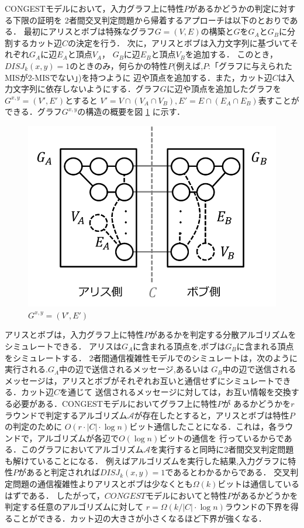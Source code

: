 \documentclass[12pt]{thesis}
\newcommand{\CONGEST}{\textsf{CONGEST}}
\theoremstyle{definition}
\begin{document}
{\CONGEST}モデルにおいて，入力グラフ上に特性$P$があるかどうかの判定に対する下限の証明を
2者間交叉判定問題から帰着するアプローチは以下のとおりである．
最初にアリスとボブは特殊なグラフ$G = (V, E)$の構築と$G$を$G_{A}$と$G_{B}$に分割するカット辺$C$の決定を行う．
次に，アリスとボブは入力文字列に基づいてそれぞれ$G_{A}$に辺$E_{A}$と頂点$V_{A}$，
$G_{B}$に辺$E_{B}$と頂点$V_{B}$を追加する．
このとき，$DISJ_{k} (x, y)=1$のときのみ，何らかの特性$P$(例えば,$P$:「グラフに与えられたMISが2-MISでない」)を持つように
辺や頂点を追加する．また，カット辺$C$は入力文字列に依存しないようにする．グラフ$G$に辺や頂点を追加したグラフを
$G^{x, y} = (V', E')$とすると
$V' = V \cap (V_{A} \cap V_{B}), E' = E \cap (E_{A} \cap E_{B})$表すことができる．グラフ$G^{x, y}$の構造の概要を図 \ref{Gxy} に示す．

\begin{figure}[ht]
\begin{center}
\includegraphics[width=120mm]{Gxy.png}
\end{center}
\caption{$G^{x, y} = (V', E')$}
\label{Gxy}
\end{figure}

アリスとボブは，入力グラフ上に特性$P$があるかを判定する分散アルゴリズムをシミュレートできる．
アリスは$G_{A}$に含まれる頂点を,ボブは$G_{B}$に含まれる頂点をシミュレートする．
2者間通信複雑性モデルでのシミュレートは，次のように実行される.$G_{A}$中の辺で送信されるメッセージ,あるいは
$G_{B}$中の辺で送信されるメッセージは，アリスとボブがそれぞれお互いと通信せずにシミュレートできる．カット辺$C$を通じて
送信されるメッセージに対しては，お互い情報を交換する必要がある．{\CONGEST}モデルにおいてグラフ上に特性$P$が
あるかどうかを$r$ラウンドで判定するアルゴリズム$\mathcal{A}$が存在したとすると，アリスとボブは特性$P$の判定のために
$O(r \cdot |C| \cdot \log n)$ビット通信したことになる．これは，各ラウンドで，アルゴリズムが各辺で$O(\log n)$ビットの通信を
行っているからである．このグラフにおいてアルゴリズム$\mathcal{A}$を実行すると同時に2者間交叉判定問題も解けていることになる．
例えばアルゴリズムを実行した結果,入力グラフに特性$P$があると判定されれば$DISJ_{k} (x, y)=1$であるとわかるからである．
交叉判定問題の通信複雑性よりアリスとボブは少なくとも$\Omega (k)$ビットは通信しているはずである．
したがって，$CONGEST$モデルにおいてと特性$P$があるかどうかを判定する任意のアルゴリズムに対して
$r = \Omega (k / |C| \cdot \log n)$ラウンドの下界を得ることができる．カット辺の大きさが小さくなるほど下界が強くなる．
\end{document}
